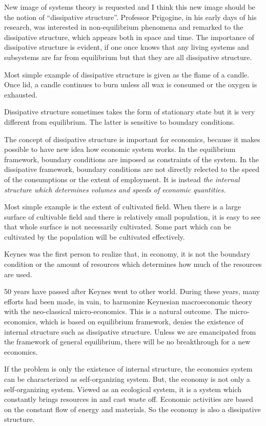 \documentclass[
]{book}
\begin{document}
New image of systems theory is requested and I think this new image should
be the notion of ``dissipative structure''. Professor Prigogine, in his early days
of his research, was interested in non-equilibrium phenomena and remarked
to the dissipative structure, which appears both in space and time. The
importance of dissipative structure is evident, if one once knows that any
living systems and subsystems are far from equilibrium but that they are all
dissipative structure.

Most simple example of dissipative structure is given as the flame of a
candle. Once lid, a candle continues to burn unless all wax is consumed or
the oxygen is exhausted.

Dissipative structure sometimes takes the form of stationary state but it is
very different from equilibrium. The latter is sensitive to boundary
conditions.

The concept of dissipative structure is important for economics, because it
makes possible to have new idea how economic system works. In the
equilibrium framework, boundary conditions are imposed as constraints of
the system. In the dissipative framework, boundary conditions are not
directly relected to the speed of the consumptions or the extent of
employment. It is instead \emph{the internal structure which determines volumes
and speeds of economic quantities.}

Most simple example is the extent of cultivated field. When there is a large
surface of cultivable field and there is relatively small population, it is easy
to see that whole surface is not necessarily cultivated. Some part which can
be cultivated by the population will be cultivated effectively.

Keynes was the first person
to realize that, in economy, it is not the boundary condition or the amount of
resources which determines how much of the resources are used.

50 years have passed after Keynes went to other world. During these years,
many efforts had been made, in vain, to harmonize Keynesian
macroeconomic theory with the neo-classical micro-economics. This is a
natural outcome. The micro-economics, which is based on equilibrium
framework, denies the existence of internal structure such as dissipative
structure. Unless we are emancipated from the framework of general
equilibrium, there will be no breakthrough for a new economics.

If the problem is only the existence of internal structure, the economics
system can be characterized as self-organizing system. But, the economy is
not only a self-organizing system. Viewed as an ecological system, it is a
system which constantly brings resources in and cast waste off. Economic
activities are based on the constant flow of energy and materials. So the
economy is also a dissipative structure.
\end{document}
